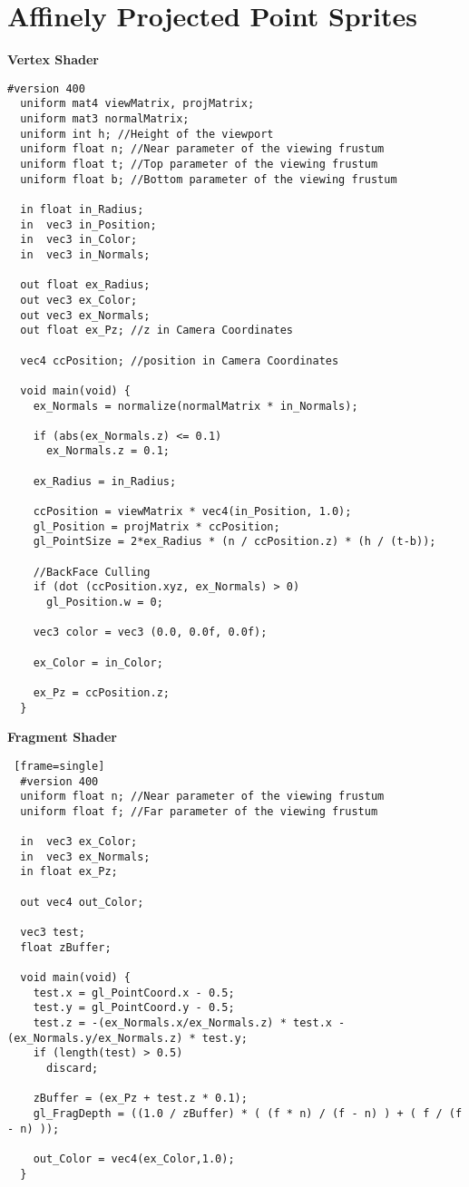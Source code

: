 \section{Affinely Projected Point Sprites \label{affinely}}
\textbf{Vertex Shader}
\begin{lstlisting}[frame=single]
  #version 400
  uniform mat4 viewMatrix, projMatrix;
  uniform mat3 normalMatrix;
  uniform int h; //Height of the viewport
  uniform float n; //Near parameter of the viewing frustum
  uniform float t; //Top parameter of the viewing frustum
  uniform float b; //Bottom parameter of the viewing frustum

  in float in_Radius;
  in  vec3 in_Position;
  in  vec3 in_Color;
  in  vec3 in_Normals;

  out float ex_Radius;
  out vec3 ex_Color;
  out vec3 ex_Normals;
  out float ex_Pz; //z in Camera Coordinates

  vec4 ccPosition; //position in Camera Coordinates

  void main(void) {
    ex_Normals = normalize(normalMatrix * in_Normals);

    if (abs(ex_Normals.z) <= 0.1)
      ex_Normals.z = 0.1;

    ex_Radius = in_Radius;

    ccPosition = viewMatrix * vec4(in_Position, 1.0);
    gl_Position = projMatrix * ccPosition;
    gl_PointSize = 2*ex_Radius * (n / ccPosition.z) * (h / (t-b));

    //BackFace Culling
    if (dot (ccPosition.xyz, ex_Normals) > 0)
      gl_Position.w = 0;

    vec3 color = vec3 (0.0, 0.0f, 0.0f);

    ex_Color = in_Color;

    ex_Pz = ccPosition.z;
  }
\end{lstlisting}

\textbf{Fragment Shader}
\begin{lstlisting} [frame=single]
  #version 400
  uniform float n; //Near parameter of the viewing frustum
  uniform float f; //Far parameter of the viewing frustum

  in  vec3 ex_Color;
  in  vec3 ex_Normals;
  in float ex_Pz;

  out vec4 out_Color;

  vec3 test;
  float zBuffer;

  void main(void) {
    test.x = gl_PointCoord.x - 0.5;
    test.y = gl_PointCoord.y - 0.5;
    test.z = -(ex_Normals.x/ex_Normals.z) * test.x - (ex_Normals.y/ex_Normals.z) * test.y;
    if (length(test) > 0.5)
      discard;

    zBuffer = (ex_Pz + test.z * 0.1);
    gl_FragDepth = ((1.0 / zBuffer) * ( (f * n) / (f - n) ) + ( f / (f - n) ));

    out_Color = vec4(ex_Color,1.0);
  }
\end{lstlisting}
\vfill

